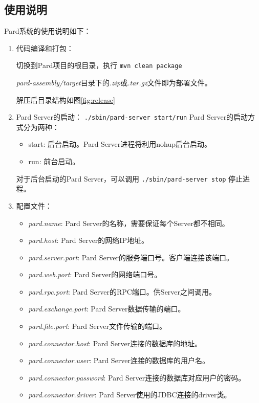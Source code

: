 \documentclass[a4paper, 12pt]{ctexart}
\begin{document}
\subsection{使用说明}
Pard系统的使用说明如下：
\begin{enumerate}
\item 代码编译和打包：

切换到Pard项目的根目录，执行
\lstinline[language=bash]|mvn clean package|

\textit{pard-assembly/target}目录下的\textit{.zip}或\textit{.tar.gz}文件即为部署文件。

解压后目录结构如图\ref{fig:release}

\item Pard Server的启动：
\lstinline[language=bash]|./sbin/pard-server start/run|
Pard Server的启动方式分为两种：
\begin{itemize}
	\item start: 后台启动。Pard Server进程将利用nohup后台启动。
	\item run: 前台启动。
\end{itemize}
对于后台启动的Pard Server，可以调用
\lstinline[language=bash]|./sbin/pard-server stop|
停止进程。

\item 配置文件：
\begin{itemize}
\item \textit{pard.name}: Pard Server的名称，需要保证每个Server都不相同。
\item \textit{pard.host}: Pard Server的网络IP地址。
\item \textit{pard.server.port}: Pard Server的服务端口号。客户端连接该端口。
\item \textit{pard.web.port}: Pard Server的网络端口号。
\item \textit{pard.rpc.port}: Pard Server的RPC端口。供Server之间调用。
\item \textit{pard.exchange.port}: Pard Server数据传输的端口。
\item \textit{pard.file.port}: Pard Server文件传输的端口。
\item \textit{pard.connector.host}: Pard Server连接的数据库的地址。
\item \textit{pard.connector.user}: Pard Server连接的数据库的用户名。
\item \textit{pard.connector.password}: Pard Server连接的数据库对应用户的密码。
\item \textit{pard.connector.driver}: Pard Server使用的JDBC连接的driver类。
\end{itemize}
\end{enumerate}
\end{document}
